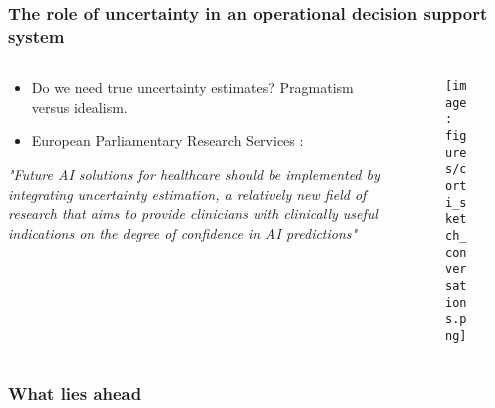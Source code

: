 \begin{frame}
    \frametitle{The role of uncertainty in an operational decision support system}
    \begin{columns}
        \begin{column}{0.6\textwidth}
            \begin{itemize}
                \item Do we need true uncertainty estimates? Pragmatism versus idealism.
                \item European Parliamentary Research Services \cite{europeanparliament_artificial_2022}:
            \end{itemize}
            \vspace{0.5em}
            \begin{center}
                {\itshape "Future AI solutions for healthcare should be implemented by integrating uncertainty estimation, a relatively new field of research that aims to provide clinicians with clinically useful indications on the degree of confidence in AI predictions"}
            \end{center}
        \end{column}
        \begin{column}{0.4\textwidth}
            \vspace{-2em}
            \begin{figure}[t]
                \centering
                \texttt{[image: figures/corti\_sketch\_conversations.png]}
            \end{figure}
        \end{column}
    \end{columns}
\end{frame}


\begin{frame}
    \frametitle{What lies ahead}
            

\end{frame}



